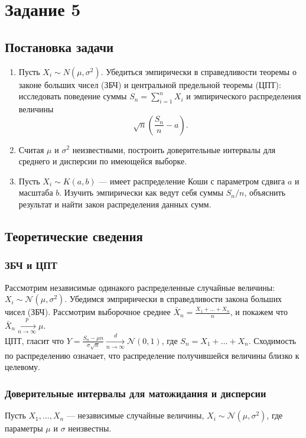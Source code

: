 \documentclass[11pt]{article}
\begin{document}
\section{Задание 5}
\subsection{Постановка задачи}
\begin{enumerate}
  \item Пусть $X_i \sim N(\mu, \sigma^2).$ Убедиться эмпирически в справедливости теоремы о законе больших чисел (ЗБЧ) и центральной предельной теоремы (ЦПТ): исследовать поведение суммы $S_n = \sum_{i=1}^n X_i$ и эмпирического распределения величины
$$
\sqrt{n} ( \frac{S_n}{n} - a). 
$$
  \item Считая $\mu$ и $\sigma^2$ неизвестными, построить доверительные интервалы для среднего и дисперсии по имеющейся выборке.
  \item Пусть $X_i \sim K(a,b)$ — имеет распределение Коши с параметром сдвига $a$ и масштаба $b$. Изучить эмпирически как ведут себя суммы $S_n/n$, объяснить результат и найти закон распределения данных сумм.
\end{enumerate}
\subsection{Теоретические сведения}
\subsubsection{ЗБЧ и ЦПТ}
Рассмотрим независимые одинакого распределенные случайные величины: $X_i \sim \mathcal{N} (\mu, \sigma^2)$. Убедимся эмприрически в справедливости закона больших чисел (ЗБЧ). Рассмотрим выборочное среднее $\bar{X}_n = \frac{X_1 + \dots + X_n}{n}$, и покажем что $\bar{X}_n \xrightarrow[n \to \infty]{p} \mu$.\\
ЦПТ, гласит что $Y = \frac{S_n - \mu n}{\sigma \sqrt n} \xrightarrow[n \to \infty]{d} \mathcal{N}(0, 1)$, где $S_n = X_1 + \dots + X_n$. Сходимость по распределению означает, что распределение получившейся величины близко к целевому.
\subsubsection{Доверительные интервалы для матожидания и дисперсии}
Пусть $X_1,\dots,X_n$ — независимые случайные величины, $X_i \sim \mathcal N(\mu,\sigma^2)$, где параметры $\mu$ и $\sigma$ неизвестны.
\end{document}
